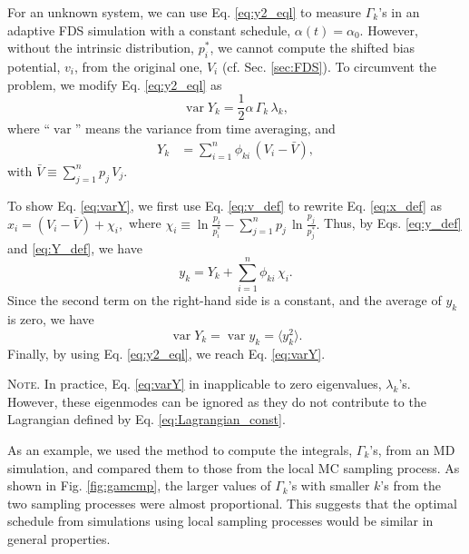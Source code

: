 \documentclass[reprint, floatfix]{revtex4-1}
\newcommand{\note}[1]{{\color{DarkGreen}\footnotesize \textsc{Note.} #1}}
\begin{document}
%
For an unknown system,
we can use Eq. \eqref{eq:y2_eql} to
measure $\Gamma_k$'s in
an adaptive FDS simulation
with a constant schedule,
$\alpha(t) = \alpha_0$.
%
However,
without the intrinsic distribution, $p^*_i$,
we cannot compute the shifted bias potential, $v_i$,
from the original one, $V_i$
(cf. Sec. \ref{sec:FDS}).
%
To circumvent the problem, we
modify Eq. \eqref{eq:y2_eql} as
%
\begin{equation}
  \operatorname{var} Y_k
  =
  \frac{1}{2}
  \alpha \, \Gamma_k \, \lambda_k,
\label{eq:varY}
\end{equation}
%
where
``$\operatorname{var}$''
means the variance from time averaging,
and
%
\begin{align}
Y_k
&=
\sum_{ i = 1 }^n
  \phi_{k i} \, (V_i - \bar V),
\label{eq:Y_def}
\end{align}
%
with
$
\bar V
\equiv
\sum_{ j = 1 }^n p_j \, V_j.
$

To show Eq. \eqref{eq:varY},
we first use Eq. \eqref{eq:v_def}
to rewrite Eq. \eqref{eq:x_def}
as
$
  x_i
  =
  (V_i - \bar V) + \chi_i,
$
where
$
  \chi_i
  \equiv
  \ln \frac{ p_i } { p^*_i }
  -
  \sum_{ j = 1 }^n
    p_j \, \ln \frac{ p_j } { p^*_j }.
$
Thus, by Eqs. \eqref{eq:y_def} and \eqref{eq:Y_def},
we have
$$
y_k = Y_k + \sum_{i = 1}^n \phi_{k i} \, \chi_i.
$$
Since the second term on the right-hand side
is a constant, and the average of $y_k$ is zero,
we have
$$
\operatorname{var} Y_k
=
\operatorname{var} y_k
=
\langle y_k^2 \rangle.
$$
Finally, by using Eq. \eqref{eq:y2_eql},
we reach Eq. \eqref{eq:varY}.

\note{In practice, Eq. \eqref{eq:varY}
in inapplicable to zero eigenvalues, $\lambda_k$'s.
%
However, these eigenmodes can be ignored
as they do not contribute to the Lagrangian defined by
Eq. \eqref{eq:Lagrangian_const}.
}


As an example, we used the method to compute
the integrals, $\Gamma_k$'s, from an MD simulation,
and compared them to those from
the local MC sampling process.
%
As shown in Fig. \ref{fig:gamcmp},
the larger values of $\Gamma_k$'s
with smaller $k$'s
from the two sampling processes
were almost proportional.
%
This suggests that
the optimal schedule
from simulations using local sampling processes
would be similar in general properties.
\end{document}
